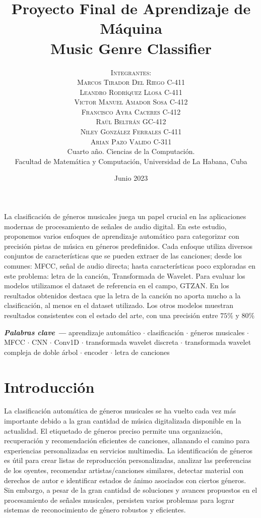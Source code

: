 \documentclass[colorinlistoftodos,twoside,twocolumn,10pt]{article} %
\title{\normalsize{Proyecto Final de Aprendizaje de Máquina}\\
	\Huge\bfseries Music Genre Classifier\\
} %
\author{%
	\normalsize\textsc{Integrantes:}\\
	\normalsize\textsc{Marcos Tirador Del Riego  C-411}\\
	\normalsize\textsc{Leandro Rodr\'iquez Llosa  C-411}\\
	\normalsize\textsc{Victor Manuel Amador Sosa C-412}\\
	\normalsize\textsc{Francisco Ayra Caceres C-412}\\
	\normalsize\textsc{Ra\'ul Beltr\'an G\ómez C-412}\\
	\normalsize\textsc{Niley Gonz\'alez Ferrales  C-411}\\
	\normalsize\textsc{Arian Pazo Valido  C-311} \\[2ex]
	\small Cuarto a\~no. Ciencias de la Computaci\'on. \\ %
	\small Facultad de Matem\'atica y Computaci\'on, Universidad de La Habana, Cuba \\ %
}
\date{\footnotesize Junio 2023 } %
\providecommand{\keywords}[1]
{
	\small	
	\vspace{0.5em}
	\noindent \textbf{\textit{Palabras clave --- }} #1
}
\renewenvironment{abstract}
{\small
	\begin{center}
		\bfseries \abstractname\vspace{-.5em}\vspace{0pt}
	\end{center}
	\list{}{
		\setlength{\leftmargin}{0.9cm}%
		\setlength{\rightmargin}{\leftmargin}%
	}%
	\item\relax}
{\endlist}
\begin{document}
	\maketitle

	\begin{abstract}

La clasificación de géneros musicales juega un papel crucial en las aplicaciones modernas de procesamiento de señales de audio digital. En este estudio, proponemos varios enfoques de aprendizaje automático para categorizar con precisión pistas de música en géneros predefinidos. Cada enfoque utiliza diversos conjuntos de características que se pueden extraer de las canciones; desde los comunes: MFCC, señal de audio directa; hasta características poco exploradas en este problema: letra de la canción, Transformada de Wavelet. Para evaluar los modelos utilizamos el dataset de referencia en el campo, GTZAN. En los resultados obtenidos destaca que la letra de la canción no aporta mucho a la clasificación, al menos en el dataset utilizado. Los otros modelos muestran resultados consistentes con el estado del arte, con una precisión entre $75\%$ y $80\%$

		\vspace{1em}
		\keywords{ 
			aprendizaje automático \textbf{$\cdot$} clasificación \textbf{$\cdot$}  géneros musicales \textbf{$\cdot$} MFCC  \textbf{$\cdot$} CNN  \textbf{$\cdot$} Conv1D \textbf{$\cdot$} transformada wavelet discreta \textbf{$\cdot$} transformada wavelet compleja de doble árbol  \textbf{$\cdot$} encoder  \textbf{$\cdot$} letra de canciones 
		}

	\end{abstract}
	
	
	\section{Introducción}
	La clasificación automática de géneros musicales se ha vuelto cada vez más importante debido a la gran cantidad de música digitalizada disponible en la actualidad. El etiquetado de géneros preciso permite una organización, recuperación y recomendación eficientes de canciones, allanando el camino para experiencias personalizadas en servicios multimedia. La identificación de géneros es útil para crear listas de reproducción personalizadas, analizar las preferencias de los oyentes, recomendar artistas/canciones similares, detectar material con derechos de autor e identificar estados de ánimo asociados con ciertos géneros. Sin embargo, a pesar de la gran cantidad de soluciones y avances propuestos en el procesamiento de señales musicales, persisten varios problemas para lograr sistemas de reconocimiento de género robustos y eficientes.
\end{document}
